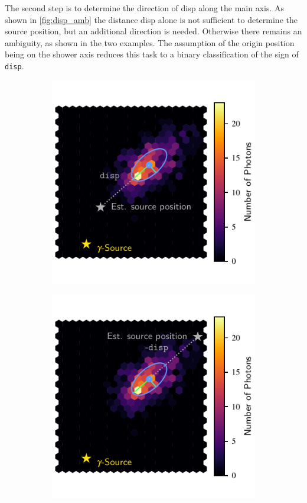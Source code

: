The second step is to determine the direction of disp along
the main axis. As shown in \autoref{fig:disp_amb} the distance disp alone is
not sufficient to determine the source position, but an additional direction is
needed. Otherwise there remains an ambiguity, as shown in the two examples.
The assumption of the origin position being on the shower axis reduces this
task to a binary classification of the sign of \texttt{disp}.
%
\begin{figure}
  \begin{subfigure}{0.5\textwidth}
    \includegraphics[width=\textwidth]{Plots/hillas_4.pdf}
  \end{subfigure}
  \begin{subfigure}{0.5\textwidth}
    \includegraphics[width=\textwidth]{Plots/hillas_5.pdf}

\end{subfigure}
\end{figure}
